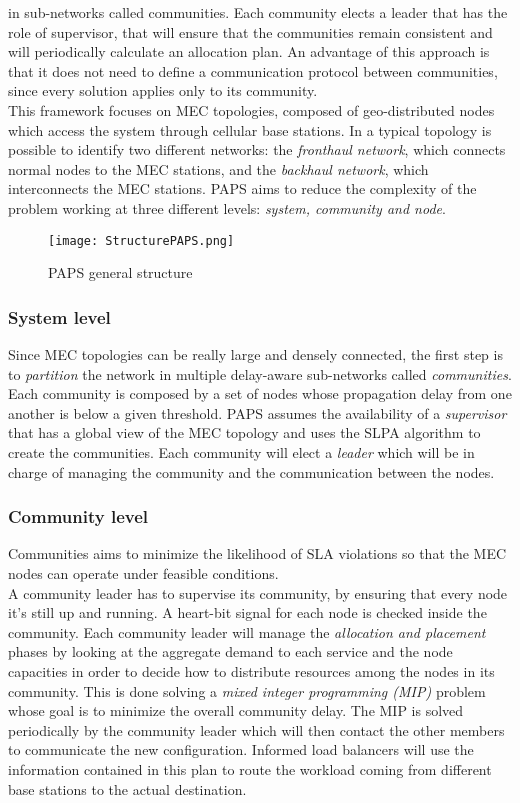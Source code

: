 in sub-networks called communities. Each community elects a leader that has the role of supervisor, that
will ensure that the communities remain consistent and will periodically calculate an allocation plan.
An advantage of this approach is that it does not need to define a communication protocol between communities,
since every solution applies only to its community.
\\
This framework focuses on MEC topologies, composed of geo-distributed nodes which access
the system through cellular base stations. In a typical topology is possible to identify
two different networks: the \textit{fronthaul network}, which connects normal nodes to 
the MEC stations, and the \textit{backhaul network}, which interconnects the MEC stations.
PAPS aims to reduce the complexity of the problem working at three different levels: 
\textit{system, community and node}. 
\\
\begin{figure}[h]
    \texttt{[image: StructurePAPS.png]}
    \label{fig:structure}
    \caption{PAPS general structure}
\end{figure}

\subsubsection*{System level}
Since MEC topologies can be really large and densely connected, the first step is to \textit{partition}
the network in multiple delay-aware sub-networks called \textit{communities}. Each community
is composed by a set of nodes whose propagation delay from one another is below a given 
threshold. PAPS assumes the availability of a \textit{supervisor} that has a global view of
the MEC topology and uses the SLPA \cite{SLPA} algorithm to create the communities. Each community will
elect a \textit{leader} which will be in charge of managing the community and the communication
between the nodes.

\subsubsection*{Community level}
Communities aims to minimize the likelihood of SLA violations so that the MEC nodes
can operate under feasible conditions.\\
A community leader has to supervise its community, by ensuring that every node it's still up and running.
A heart-bit signal for each node is checked inside the community.
Each community leader will manage the \textit{allocation and placement} phases by looking at 
the aggregate demand to each service and the node capacities in order to decide how to 
distribute resources among the nodes in its community. This is done solving a \textit{mixed
integer programming (MIP)} problem whose goal is to minimize the overall community delay. 
The MIP is solved periodically by the community leader which will then contact the other members
to communicate the new configuration.
Informed load balancers will use the information contained in this plan to route the workload 
coming from different base stations to the actual destination.

